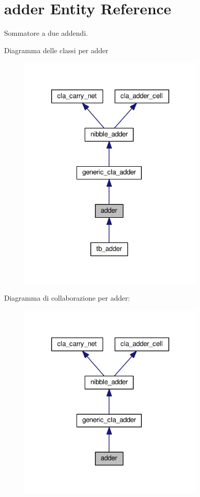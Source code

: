 \hypertarget{classadder}{\section{adder Entity Reference}
\label{classadder}
}


Sommatore a due addendi.  




Diagramma delle classi per adder
\nopagebreak
\begin{figure}[H]
\begin{center}
\leavevmode
\includegraphics[width=252pt]{classadder__inherit__graph}
\end{center}
\end{figure}


Diagramma di collaborazione per adder\+:
\nopagebreak
\begin{figure}[H]
\begin{center}
\leavevmode
\includegraphics[width=252pt]{classadder__coll__graph}
\end{center}
\end{figure}
